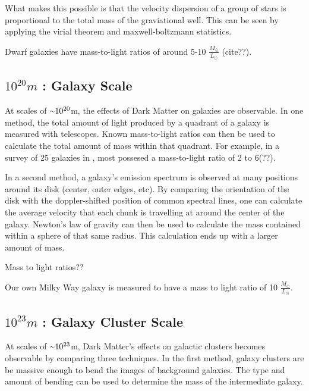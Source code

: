 What makes this possible is that the velocity dispersion of a group of stars is proportional to the total mass of the graviational well.
This can be seen by applying the virial theorem and maxwell-boltzmann statistics.

Dwarf galaxies have mass-to-light ratios of around 5-10 $\frac{M_\odot}{L_\odot}$ (cite??).



\subsection{$10^{20}m$ : Galaxy Scale}
%
At scales of $\nicetilde 10^{20}$m, the effects of Dark Matter on galaxies are observable.
In one method, the total amount of light produced by a quadrant of a galaxy is measured with telescopes.
Known mass-to-light ratios can then be used to calculate the total amount of mass within that quadrant.
For example, in a survey of 25 galaxies in \cite{galaxy_mass_light_ratio}, most possesed a mass-to-light ratio of 2 to 6(??).


In a second method, a galaxy's emission spectrum is observed at many positions around its disk (center, outer edges, etc).
By comparing the orientation of the disk with the doppler-shifted position of common spectral lines, one can calculate the average velocity that each chunk is travelling at around the center of the galaxy.
Newton's law of gravity can then be used to calculate the mass contained within a sphere of that same radius.
This calculation ends up with a larger amount of mass.

Mass to light ratios??

Our own Milky Way galaxy is measured to have a mass to light ratio of 10 $\frac{M_{\odot}}{L_{\odot}}$.


\subsection{$10^{23}m$ : Galaxy Cluster Scale}
%
At scales of $\nicetilde 10^{23}$m, Dark Matter's effects on galactic clusters becomes observable by comparing three techniques.
In the first method, galaxy clusters are be massive enough to bend the images of background galaxies.
The type and amount of bending can be used to determine the mass of the intermediate galaxy.

